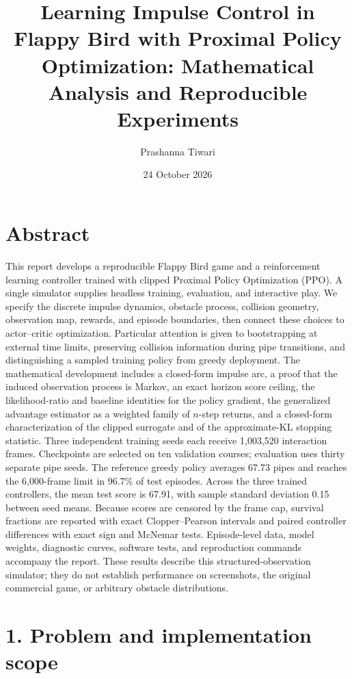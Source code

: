 \documentclass[
  11pt,
]{article}
\title{Learning Impulse Control in Flappy Bird with Proximal Policy
Optimization: Mathematical Analysis and Reproducible Experiments}
\author{Prashanna Tiwari}
\date{24 October 2026}
\begin{document}
\maketitle

\section{Abstract}\label{abstract}

This report develops a reproducible Flappy Bird game and a reinforcement
learning controller trained with clipped Proximal Policy Optimization
(PPO). A single simulator supplies headless training, evaluation, and
interactive play. We specify the discrete impulse dynamics, obstacle
process, collision geometry, observation map, rewards, and episode
boundaries, then connect these choices to actor--critic optimization.
Particular attention is given to bootstrapping at external time limits,
preserving collision information during pipe transitions, and
distinguishing a sampled training policy from greedy deployment. The
mathematical development includes a closed-form impulse arc, a proof
that the induced observation process is Markov, an exact horizon score
ceiling, the likelihood-ratio and baseline identities for the policy
gradient, the generalized advantage estimator as a weighted family of
\(n\)-step returns, and a closed-form characterization of the clipped
surrogate and of the approximate-KL stopping statistic. Three
independent training seeds each receive 1,003,520 interaction frames.
Checkpoints are selected on ten validation courses; evaluation uses
thirty separate pipe seeds. The reference greedy policy averages 67.73
pipes and reaches the 6,000-frame limit in 96.7\% of test episodes.
Across the three trained controllers, the mean test score is 67.91, with
sample standard deviation 0.15 between seed means. Because scores are
censored by the frame cap, survival fractions are reported with exact
Clopper--Pearson intervals and paired controller differences with exact
sign and McNemar tests. Episode-level data, model weights, diagnostic
curves, software tests, and reproduction commands accompany the report.
These results describe this structured-observation simulator; they do
not establish performance on screenshots, the original commercial game,
or arbitrary obstacle distributions.

\section{1. Problem and implementation
scope}\label{problem-and-implementation-scope}
\end{document}

